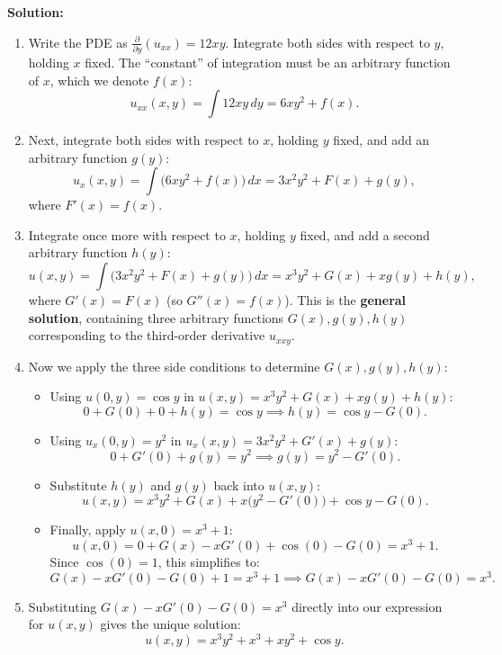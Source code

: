 \documentclass[11pt,a4paper]{article}
\begin{document}
\textbf{Solution:}
\begin{enumerate}
    \item Write the PDE as $\frac{\partial}{\partial y}(u_{xx}) = 12xy$. Integrate both sides with respect to $y$, holding $x$ fixed. The ``constant'' of integration must be an arbitrary function of $x$, which we denote $f(x)$:
    \[
        u_{xx}(x, y) = \int 12xy\,dy = 6xy^2 + f(x).
    \]
    \item Next, integrate both sides with respect to $x$, holding $y$ fixed, and add an arbitrary function $g(y)$:
    \[
        u_x(x, y) = \int \big(6xy^2 + f(x)\big)\,dx = 3x^2 y^2 + F(x) + g(y),
    \]
    where $F'(x) = f(x)$.
    \item Integrate once more with respect to $x$, holding $y$ fixed, and add a second arbitrary function $h(y)$:
    \[
        u(x, y) = \int \big(3x^2 y^2 + F(x) + g(y)\big)\,dx = x^3 y^2 + G(x) + x g(y) + h(y),
    \]
    where $G'(x) = F(x)$ (so $G''(x) = f(x)$). This is the \textbf{general solution}, containing three arbitrary functions $G(x), g(y), h(y)$ corresponding to the third-order derivative $u_{xxy}$.
    \item Now we apply the three side conditions to determine $G(x), g(y), h(y)$:
    \begin{itemize}
        \item Using $u(0, y) = \cos y$ in $u(x, y) = x^3 y^2 + G(x) + x g(y) + h(y)$:
        \[
            0 + G(0) + 0 + h(y) = \cos y \implies h(y) = \cos y - G(0).
        \]
        \item Using $u_x(0, y) = y^2$ in $u_x(x, y) = 3x^2 y^2 + G'(x) + g(y)$:
        \[
            0 + G'(0) + g(y) = y^2 \implies g(y) = y^2 - G'(0).
        \]
        \item Substitute $h(y)$ and $g(y)$ back into $u(x, y)$:
        \[
            u(x, y) = x^3 y^2 + G(x) + x\big(y^2 - G'(0)\big) + \cos y - G(0).
        \]
        \item Finally, apply $u(x, 0) = x^3 + 1$:
        \[
            u(x, 0) = 0 + G(x) - x G'(0) + \cos(0) - G(0) = x^3 + 1.
        \]
        Since $\cos(0) = 1$, this simplifies to:
        \[
            G(x) - x G'(0) - G(0) + 1 = x^3 + 1 \implies G(x) - x G'(0) - G(0) = x^3.
        \]
    \end{itemize}
    \item Substituting $G(x) - x G'(0) - G(0) = x^3$ directly into our expression for $u(x, y)$ gives the unique solution:
    \[
        u(x, y) = x^3 y^2 + x^3 + x y^2 + \cos y.
    \]
\end{enumerate}
\end{document}
